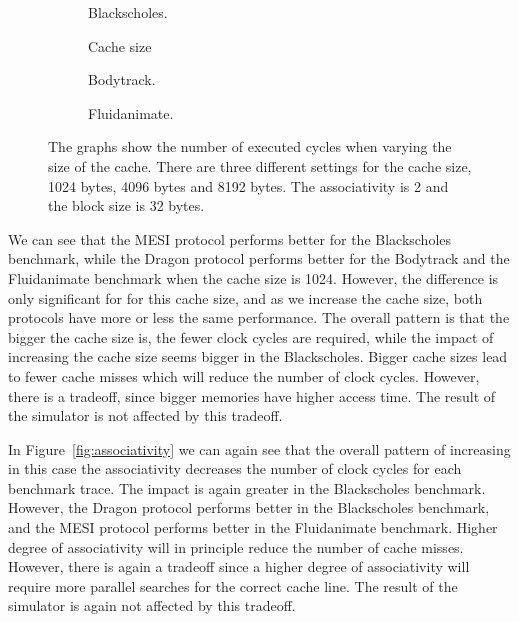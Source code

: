 \begin{figure}[H]
    \centering
    \begin{subfigure}[b]{0.33\textwidth}
        \centering
        \caption{Blackscholes.}\label{fig:cache_size_blackscholes}
    \end{subfigure}%
    \hfill
    \begin{subfigure}[b]{0.33\textwidth}
        \centering
        Cache size\par\medskip
        \caption{Bodytrack.}\label{fig:cache_size_bodytrack}
    \end{subfigure}%
    \hfill
    \begin{subfigure}[b]{0.33\textwidth}
        \centering
        \caption{Fluidanimate.}\label{fig:cache_size_fluidanimate}
    \end{subfigure}
    \hfill
    \caption{The graphs show the number of executed cycles when varying the size of the cache. There are three different settings for the cache size, 1024 bytes, 4096 bytes and 8192 bytes. The associativity is 2 and the block size is 32 bytes.}\label{fig:cache_size}
\end{figure}


We can see that the MESI protocol performs better for the Blackscholes benchmark,
while the Dragon protocol performs better for the Bodytrack and the Fluidanimate
benchmark when the cache size is 1024. However, the difference is only significant
for for this cache size, and as we increase the cache size, both protocols have more
or less the same performance. The overall pattern is that the bigger the cache size
is, the fewer clock cycles are required, while the impact of increasing the cache
size seems bigger in the Blackscholes. Bigger cache sizes lead to fewer cache misses
which will reduce the number of clock cycles. However, there is a tradeoff, since
bigger memories have higher access time. The result of the simulator is not affected
by this tradeoff.

In Figure~\ref{fig:associativity} we can again see that the overall pattern of
increasing in this case the associativity decreases the number of clock cycles
for each benchmark trace. The impact is again greater in the Blackscholes benchmark.
However, the Dragon protocol performs better in the Blackscholes benchmark, and the
MESI protocol performs better in the Fluidanimate benchmark. Higher degree of associativity
will in principle reduce the number of cache misses. However, there is again a tradeoff
since a higher degree of associativity will require more parallel searches for the correct
cache line. The result of the simulator is again not affected by this tradeoff.

